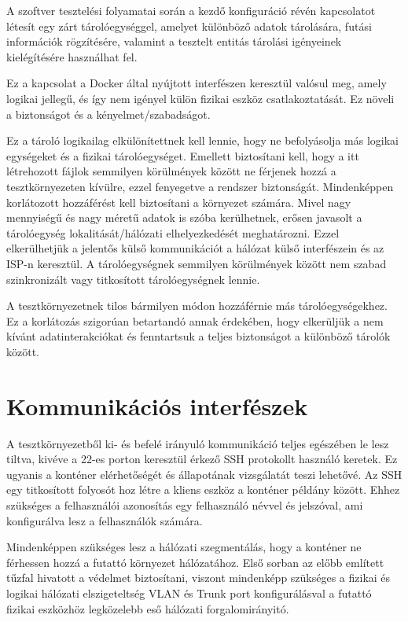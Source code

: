 \documentclass{scrreprt}
\begin{document}
A szoftver tesztelési folyamatai során a kezdő konfiguráció révén kapcsolatot létesít egy zárt tárolóegységgel, amelyet különböző adatok tárolására, futási
információk rögzítésére, valamint a tesztelt entitás tárolási igényeinek kielégítésére használhat fel.

Ez a kapcsolat a Docker által nyújtott interfészen keresztül valósul meg, amely logikai jellegű, és így nem igényel külön fizikai eszköz csatlakoztatását. Ez
növeli a biztonságot és a kényelmet/szabadságot.

Ez a tároló logikailag elkülönítettnek kell lennie, hogy ne befolyásolja más logikai egységeket és a fizikai tárolóegységet. Emellett biztosítani kell, hogy a
itt létrehozott fájlok semmilyen körülmények között ne férjenek hozzá a tesztkörnyezeten kívülre, ezzel fenyegetve a rendszer biztonságát. Mindenképpen
korlátozott hozzáférést kell biztosítani a környezet számára. Mivel nagy mennyiségű és nagy méretű adatok is szóba kerülhetnek, erősen javasolt a tárolóegység
lokalitását/hálózati elhelyezkedését meghatározni. Ezzel elkerülhetjük a jelentős külső kommunikációt a hálózat külső interfészein és az ISP-n keresztül. A
tárolóegységnek semmilyen körülmények között nem szabad szinkronizált vagy titkosított tárolóegységnek lennie.

A tesztkörnyezetnek tilos bármilyen módon hozzáférnie más tárolóegységekhez. Ez a korlátozás szigorúan betartandó annak érdekében, hogy elkerüljük a nem kívánt
adatinterakciókat és fenntartsuk a teljes biztonságot a különböző tárolók között.

\section{Kommunikációs interfészek}
A tesztkörnyezetből ki- és befelé irányuló kommunikáció teljes egészében le lesz tiltva, kivéve a 22-es porton keresztül érkező SSH protokollt használó
keretek. Ez ugyanis a konténer elérhetőségét és állapotának vizsgálatát teszi lehetővé. Az SSH egy titkosított folyosót hoz létre a kliens eszköz a konténer
példány között. Ehhez szükséges a felhasználói azonosítás egy felhasználó névvel és jelszóval, ami konfigurálva lesz a felhasználók számára.

Mindenképpen szükséges lesz a hálózati szegmentálás, hogy a konténer ne férhessen hozzá a futattó környezet hálózatához. Első sorban az előbb említett tűzfal
hivatott a védelmet biztosítani, viszont mindenképp szükséges a fizikai és logikai hálózati elszigeteltség VLAN és Trunk port konfigurálásval a futattó fizikai
eszközhöz legközelebb eső hálózati forgalomirányitó.
\end{document}
